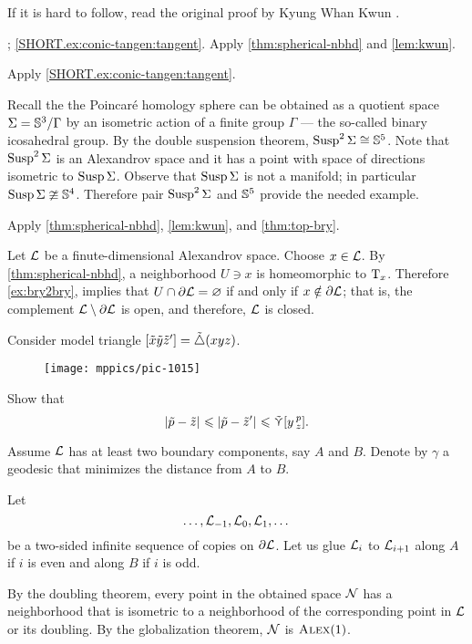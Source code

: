  If it is hard to follow, read the original proof by Kyung Whan Kwun \cite{kwun1964}.

\parbf{\ref{ex:conic-tangent}}; \ref{SHORT.ex:conic-tangen:tangent}. Apply \ref{thm:spherical-nbhd} and \ref{lem:kwun}.

 Apply \ref{SHORT.ex:conic-tangen:tangent}.

 Recall the the Poincaré homology sphere can be obtained as a quotient space $\Sigma=\mathbb{S}^3/\Gamma$ by an isometric action of a finite group $\Gamma$  --- the so-called binary icosahedral group.
By the double suspension theorem,  $\mathop{\rm Susp}\nolimits^2\Sigma\cong\mathbb{S}^5$.
Note that $\mathop{\rm Susp}\nolimits^2\Sigma$ is an Alexandrov space and it has a point with space of directions isometric to $\mathop{\rm Susp}\nolimits\Sigma$.
Observe that $\mathop{\rm Susp}\nolimits\Sigma$ is not a manifold; in particular $\mathop{\rm Susp}\nolimits\Sigma\ncong\mathbb{S}^4$.
Therefore pair $\mathop{\rm Susp}\nolimits^2\Sigma$ and $\mathbb{S}^5$ provide the needed example.

 Apply \ref{thm:spherical-nbhd}, \ref{lem:kwun}, and \ref{thm:top-bry}.

Let $\mathcal{L}$ be a finute-dimensional Alexandrov space.
Choose $x\in\mathcal{L}$.
By \ref{thm:spherical-nbhd}, a neighborhood $U\ni x$ is homeomorphic to $\mathrm{T}_x$.
Therefore \ref{ex:bry2bry}, implies that $U\cap\partial\mathcal{L}=\varnothing$ if and only if $x\notin \partial\mathcal{L}$;
that is, the complement $\mathcal{L}\setminus\partial\mathcal{L}$ is open, and therefore, $\mathcal{L}$ is closed.

Consider model triangle $[\tilde x\tilde y\tilde z']=\tilde\triangle(xyz)$.
\begin{figure}[ht!]
\vskip-0mm
\centering
\texttt{[image: mppics/pic-1015]}
\end{figure}

Show that 
\[\dist{\tilde p}{\tilde z}{}\le \dist{\tilde p}{\tilde z'}{}\le\side\hinge yp{z}.\]


Assume $\mathcal{L}$ has at least two boundary components, say $A$ and $B$.
Denote by $\gamma$ a geodesic that minimizes the distance from $A$ to $B$.

Let 
\[\dots,\mathcal{L}_{-1},\mathcal{L}_{0},\mathcal{L}_{1},\dots\]
be a two-sided infinite sequence of copies on $\partial\mathcal{L}$.
Let us glue $\mathcal{L}_{i}$ to $\mathcal{L}_{i+1}$ along $A$ if $i$ is even and along $B$ if $i$ is odd.

By the doubling theorem, every point in the obtained space $\mathcal{N}$ has a neighborhood that is isometric to a neighborhood of the corresponding point in $\mathcal{L}$ or its doubling.
By the globalization theorem, $\mathcal{N}$ is $\textsc{Alex}(1)$.

